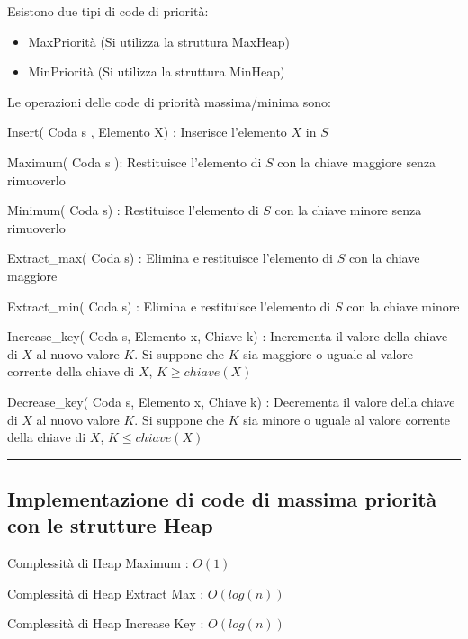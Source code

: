 \documentclass[11pt,a4paper,twoside,openright]{book}
\providecommand{\tightlist}{\setlength{\itemsep}{0pt}\setlength{\parskip}{0pt}}
\begin{document}
{{Esistono due tipi di code di priorità:}

\begin{itemize}
\tightlist
\item
  {MaxPriorità (Si utilizza la struttura MaxHeap)}
\item
  {MinPriorità (Si utilizza la struttura MinHeap)}
\end{itemize}

{Le operazioni delle code di priorità massima/minima sono:}

{Insert( Coda s , Elemento X) : Inserisce l'elemento $X$ in $S$}

{Maximum( Coda s ): Restituisce l'elemento di $S$ con la chiave maggiore senza rimuoverlo}

{Minimum( Coda s) : Restituisce l'elemento di $S$ con la chiave minore senza rimuoverlo}

{Extract\_max( Coda s) : Elimina e restituisce l'elemento di $S$ con la chiave maggiore}

{Extract\_min( Coda s) : Elimina e restituisce l'elemento di $S$ con la chiave minore}

{Increase\_key( Coda s, Elemento x, Chiave k) : Incrementa il valore della chiave di $X$ al nuovo valore $K$. Si suppone che $K$ sia maggiore o uguale al valore corrente della chiave di $X$, $K \geq chiave(X)$}

{Decrease\_key( Coda s, Elemento x, Chiave k) : Decrementa il valore della chiave di $X$ al nuovo valore $K$. Si suppone che $K$ sia minore o uguale al valore corrente della chiave di $X$, $K \leq chiave(X)$}

\begin{center}\rule{0.5\linewidth}{\linethickness}\end{center}

\subsection{Implementazione di code di massima priorità con le strutture Heap}}



{Complessità di Heap Maximum : $O(1)$}



{Complessità di Heap Extract Max : $O(log(n))$}



{Complessità di Heap Increase Key : $O(log(n))$}
\end{document}
